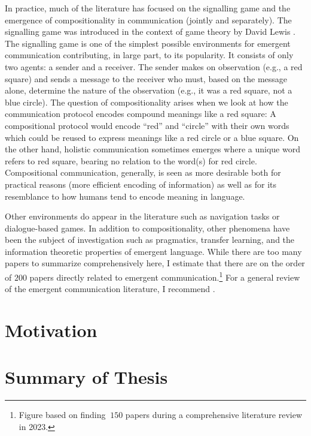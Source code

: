 In practice, much of the literature has focused on the signalling game and the emergence of compositionality in communication (jointly and separately).
The signalling game was introduced in the context of game theory by David Lewis .
The signalling game is one of the simplest possible environments for emergent communication contributing, in large part, to its popularity.
It consists of only two agents: a sender and a receiver.
The sender makes on observation (e.g., a red square) and sends a message to the receiver who must, based on the message alone, determine the nature of the observation (e.g., it was a red square, not a blue circle).
The question of compositionality arises when we look at how the communication protocol encodes compound meanings like a red square: A compositional protocol would encode ``red'' and ``circle'' with their own words which could be reused to express meanings like a red circle or a blue square.
On the other hand, holistic communication sometimes emerges where a unique word refers to red square, bearing no relation to the word(s) for red circle.
Compositional communication, generally, is seen as more desirable both for practical reasons (more efficient encoding of information) as well as for its resemblance to how humans tend to encode meaning in language.

Other environments do appear in the literature such as navigation tasks or dialogue-based games.
In addition to compositionality, other phenomena have been the subject of investigation such as pragmatics, transfer learning, and the information theoretic properties of emergent language.
While there are too many papers to summarize comprehensively here, I estimate that there are on the order of $200$ papers directly related to emergent communication.\footnote{Figure based on finding ${~}150$ papers during a comprehensive literature review in 2023.}
For a general review of the emergent communication literature, I recommend .


\section{Motivation}



\section{Summary of Thesis}


